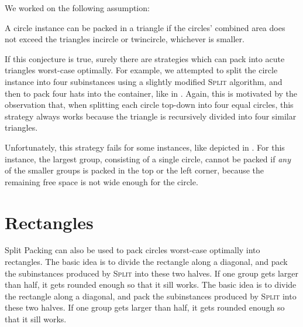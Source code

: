 \documentclass[a4paper,style=print,oneside,bibliography=totoc,nexus,lnum,extramargin]{tubsbook}
\begin{document}

We worked on the following assumption:

\begin{conjecture}
    A circle instance can be packed in a triangle if the circles' combined area does not exceed the triangles incircle or twincircle, whichever is smaller.
\end{conjecture}

If this conjecture is true, surely there are strategies which can pack into acute triangles worst-case optimally. For example, we attempted to split the circle instance into four subinstances using a slightly modified \textsc{Split} algorithm, and then to pack four hats into the container, like in . Again, this is motivated by the observation that, when splitting each circle top-down into four equal circles, this strategy always works because the triangle is recursively divided into four similar triangles.


Unfortunately, this strategy fails for some instances, like depicted in . For this instance, the largest group, consisting of a single circle, cannot be packed if \emph{any} of the smaller groups is packed in the top or the left corner, because the remaining free space is not wide enough for the circle.


\section{Rectangles}\label{sec:rectangles}

Split Packing can also be used to pack circles worst-case optimally into rectangles. The basic idea is to divide the rectangle along a diagonal, and pack the subinstances produced by \textsc{Split} into these two halves. If one group gets larger than half, it gets rounded enough so that it sill works. The basic idea is to divide the rectangle along a diagonal, and pack the subinstances produced by \textsc{Split} into these two halves. If one group gets larger than half, it gets rounded enough so that it sill works.
\end{document}
